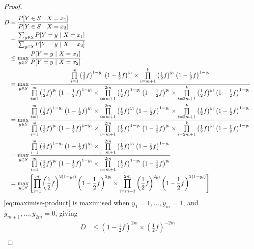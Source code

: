 \documentclass{article}
\begin{document}
\begin{enumerate}
\begin{proof}
	\begin{align}
		D &= \frac{P[Y\in S~|~X=x_1]}{P[Y\in S~|~X=x_2]}\\
			&= \frac{\sum_{y\in S}P[Y=y~|~X=x_1]}{\sum_{y\in S}P[Y=y~|~X=x_2]}\\
			&\leq \max_{y\in S}\frac{P[Y=y~|~X=x_1]}{P[Y=y~|~X=x_2]}\\
			&=\max_{y\in S}\frac{%
				\prod\limits_{i=1}^m \left(\frac{1}{2}f\right)^{1-y_i}\left(1-\frac{1}{2}f\right)^{y_i}%
				\times \prod\limits_{i=m+1}^k\left(\frac{1}{2}f\right)^{y_i} \left(1-\frac{1}{2}f\right)^{1-y_i}
			}{%
				\prod\limits_{i=1}^m \left(\frac{1}{2}f\right)^{y_i}\left(1-\frac{1}{2}f\right)^{1-y_i}%
				\times \prod\limits_{i=m+1}^{2m}\left(\frac{1}{2}f\right)^{1-y_i} \left(1-\frac{1}{2}f\right)^{y_i}\times%
				\prod\limits_{i=2m+1}^{k}\left(\frac{1}{2}f\right)^{y_i}\left(1-\frac{1}{2}f\right)^{1-y_i}
			}\\
			&=\max_{y\in S}\frac{%
				\prod\limits_{i=1}^m \left(\frac{1}{2}f\right)^{1-y_i}\left(1-\frac{1}{2}f\right)^{y_i}%
				\times \prod\limits_{i=m+1}^{2m}\left(\frac{1}{2}f\right)^{y_i} \left(1-\frac{1}{2}f\right)^{1-y_i}%
				\times \prod\limits_{i=2m+1}^{k}\left(\frac{1}{2}f\right)^{y_i} \left(1-\frac{1}{2}f\right)^{1-y_i}
			}{%
				\prod\limits_{i=1}^m \left(\frac{1}{2}f\right)^{y_i}\left(1-\frac{1}{2}f\right)^{1-y_i}%
				\times \prod\limits_{i=m+1}^{2m}\left(\frac{1}{2}f\right)^{1-y_i} \left(1-\frac{1}{2}f\right)^{y_i}%
				\times\prod\limits_{i=2m+1}^{k}\left(\frac{1}{2}f\right)^{y_i}\left(1-\frac{1}{2}f\right)^{1-y_i}
			}\\
			&=\max_{y\in S}\frac{%
				\prod\limits_{i=1}^m \left(\frac{1}{2}f\right)^{1-y_i}\left(1-\frac{1}{2}f\right)^{y_i}%
				\times \prod\limits_{i=m+1}^{2m}\left(\frac{1}{2}f\right)^{y_i} \left(1-\frac{1}{2}f\right)^{1-y_i}%
			}{%
				\prod\limits_{i=1}^m \left(\frac{1}{2}f\right)^{y_i}\left(1-\frac{1}{2}f\right)^{1-y_i}%
				\times \prod\limits_{i=m+1}^{2m}\left(\frac{1}{2}f\right)^{1-y_i} \left(1-\frac{1}{2}f\right)^{y_i}%
			}\\ \label{eq:maximise-product}
			&=\max_{y\in S}\left[%
				\prod\limits_{i=1}^m \left(\frac{1}{2}f\right)^{2(1-y_i)}\left(1-\frac{1}{2}f\right)^{2y_i}%
				\times \prod\limits_{i=m+1}^{2m}\left(\frac{1}{2}f\right)^{2y_i} \left(1-\frac{1}{2}f\right)^{2(1-y_i)}\right]%
	\end{align}
	\ref{eq:maximise-product} is maximised when $y_1=1,...,y_m=1$, and $y_{m+1},...,y_{2m}=0$, giving
	\begin{align}
		D &\leq \left(1-\frac{1}{2}f\right)^{2m}\times\left(\frac{1}{2}f\right)^{-2m}\\

\end{align}
\end{proof}
\end{enumerate}
\end{document}
